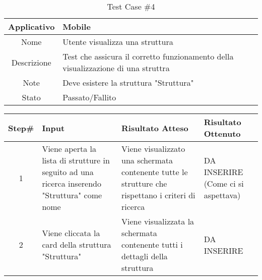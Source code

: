 
\begin{table}[H]
    \centering
    \footnotesize
    \caption{Test Case \#4}
    \begin{tabularx}{\textwidth}{|c|X|}
        \hline
        Applicativo & Mobile\\
        \hline
        Nome & Utente visualizza una struttura  \\
        \hline
        Descrizione & Test che assicura il corretto funzionamento della visualizzazione di una struttra\\
        \hline
        Note &  Deve esistere la struttura "Struttura"\\
        \hline
        Stato & Passato/Fallito\\
        \hline

    \end{tabularx}
    \setlength{\tabcolsep}{8pt}
    \renewcommand{\arraystretch}{1.5}
\end{table}
\begin{table}[H]
    \footnotesize
    \begin{tabularx}{\textwidth}{|c|X|X|X|}
        \hline
        Step\# & Input & Risultato Atteso & Risultato Ottenuto \\
        \hline
         1 & Viene aperta la lista di strutture in seguito ad una ricerca inserendo "Struttura" come nome
         & Viene visualizzato una schermata contenente tutte le strutture che rispettano i criteri di ricerca
         &DA INSERIRE (Come ci si aspettava)\\
          \hline
        2 & Viene cliccata la card della struttura "Struttura"
        & Viene visualizzata la schermata contenente tutti i dettagli della struttura
        & DA INSERIRE\\
         \hline 
        
    \end{tabularx}
\end{table}
    
       
